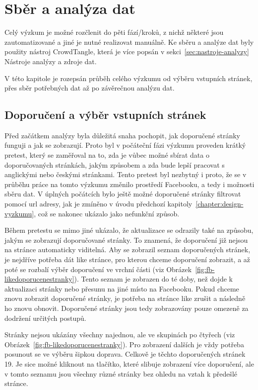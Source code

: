 \chapter{Sběr a analýza dat}
\label{chapter:data}
    Celý výzkum je možné rozčlenit do pěti fází/kroků, z nichž některé jsou zautomatizované a jiné je nutné realizovat manuálně. Ke sběru a analýze dat byly použity nástroj CrowdTangle, která je více popsán v sekci~\ref{sec:nastroje-analyzy} Nástroje analýzy a zdroje dat.
    
    V této kapitole je rozepsán průběh celého výzkumu od výběru vstupních stránek, přes sběr potřebných dat až po závěrečnou analýzu dat. 

\section{Doporučení a výběr vstupních stránek}
\label{sec:vyber-vstup-stranek}
    Před začátkem analýzy byla důležitá snaha pochopit, jak doporučené stránky funguji a jak se zobrazují. Proto byl v počáteční fázi výzkumu proveden krátký pretest, který se zaměřoval na to, zda je vůbec možné sbírat data o doporučova\-ných stránkách, jakým způsobem a zda bude lepší pracovat s anglickými nebo českými stránkami. Tento pretest byl nezbytný i proto, že se v průběhu práce na tomto výzkumu změnilo prostředí Facebooku, a tedy i možnosti sběru dat. V úplných počátcích bylo ještě možné doporučené stránky filtrovat pomocí url adresy, jak je zmíněno v úvodu předchozí kapitoly~\ref{chapter:design-vyzkumu}, což se nakonec ukázalo jako nefunkční způsob. 
    
    Během pretestu se mimo jiné ukázalo, že aktualizace se odrazily také na způsobu, jakým se zobrazují doporučované stránky. To znamená, že doporučení již nejsou na stránce automaticky viditelná. Aby se zobrazil seznam doporučených stránek, je nejdříve potřeba dát like stránce, pro kterou chceme doporučení zobrazit, a až poté se rozbalí výběr doporučení ve vrchní části (viz Obrázek~\ref{fig:fb-likedoporucenestranky}). Tento seznam je zobrazen do té doby, než dojde k aktualizaci stránky nebo přesunu na jiné místo na Facebooku. Pokud chceme znovu zobrazit doporučené stránky, je potřeba na stránce like zrušit a následně ho znovu obnovit. Doporučené stránky jsou tedy zobrazovány pouze omezeně za dodržení určitých postupů.
    
    Stránky nejsou ukázány všechny najednou, ale ve skupinách po čtyřech (viz Obrázek~\ref{fig:fb-likedoporucenestranky}). Pro zobrazení dalších je vždy potřeba posunout se ve výběru šipkou doprava. Celkově je těchto doporučených stránek 19. Je sice možné kliknout na tlačítko, které slibuje zobrazení více doporučení, ale v tomto seznamu jsou všechny různé stránky bez ohledu na vztah k předešlé stránce. 
  
